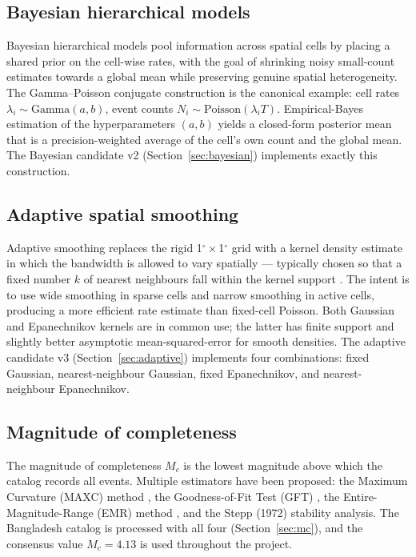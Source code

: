 \documentclass[10pt,a4paper,twocolumn]{article}
\begin{document}
\subsection{Bayesian hierarchical models}

Bayesian hierarchical models pool information across spatial cells by placing a shared prior on the cell-wise rates, with the goal of shrinking noisy small-count estimates towards a global mean while preserving genuine spatial heterogeneity. The Gamma--Poisson conjugate construction \cite{clayton1987} is the canonical example: cell rates $\lambda_i \sim \text{Gamma}(a,b)$, event counts $N_i \sim \text{Poisson}(\lambda_i T)$. Empirical-Bayes estimation of the hyperparameters $(a,b)$ yields a closed-form posterior mean that is a precision-weighted average of the cell's own count and the global mean. The Bayesian candidate v2 (Section~\ref{sec:bayesian}) implements exactly this construction.

\subsection{Adaptive spatial smoothing}

Adaptive smoothing replaces the rigid 1$^\circ\times$1$^\circ$ grid with a kernel density estimate in which the bandwidth is allowed to vary spatially --- typically chosen so that a fixed number $k$ of nearest neighbours fall within the kernel support \cite{marsan2008, silverman1986}. The intent is to use wide smoothing in sparse cells and narrow smoothing in active cells, producing a more efficient rate estimate than fixed-cell Poisson. Both Gaussian and Epanechnikov kernels are in common use; the latter has finite support and slightly better asymptotic mean-squared-error for smooth densities. The adaptive candidate v3 (Section~\ref{sec:adaptive}) implements four combinations: fixed Gaussian, nearest-neighbour Gaussian, fixed Epanechnikov, and nearest-neighbour Epanechnikov.

\subsection{Magnitude of completeness}

The magnitude of completeness $M_c$ is the lowest magnitude above which the catalog records all events. Multiple estimators have been proposed: the Maximum Curvature (MAXC) method \cite{wiemer2000}, the Goodness-of-Fit Test (GFT) \cite{wiemer2000}, the Entire-Magnitude-Range (EMR) method \cite{woessner2005}, and the Stepp (1972) stability analysis. The Bangladesh catalog is processed with all four (Section~\ref{sec:mc}), and the consensus value $M_c=4.13$ is used throughout the project.
\end{document}
